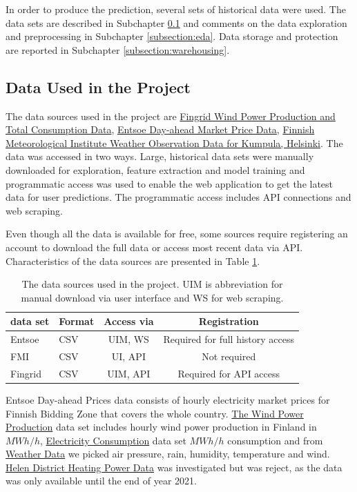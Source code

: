 \documentclass{article}
\begin{document}
In order to produce the prediction, several sets of historical data were used. The data sets are described in Subchapter \ref{subsection:datadescription} and comments on the data exploration and preprocessing in Subchapter \ref{subsection:eda}. Data storage and protection are reported in Subchapter \ref{subsection:warehousing}.

\subsection{Data Used in the Project}
\label{subsection:datadescription}


The data sources used in the project are \href{https://data.fingrid.fi/en}{Fingrid Wind Power Production and Total Consumption Data}, \href{https://transparency.entsoe.eu}{Entsoe Day-ahead Market Price Data}, \href{https://en.ilmatieteenlaitos.fi/open-data}{Finnish Meteorological Institute Weather Observation Data for Kumpula, Helsinki}. The data was accessed in two ways. Large, historical data sets were manually downloaded for exploration, feature extraction and model training and programmatic access was used to enable the web application to get the latest data for user predictions. The programmatic access includes API connections and web scraping.

Even though all the data is available for free, some sources require registering an account to download the full data or access most recent data via API. Characteristics of the data sources are presented in Table \ref{table:source-characteristics}.

\begin{table}[ht] 
\centering 
\begin{tabular}{l||l c c} 
data set & Format & Access via & Registration\\ 
\hline \hline
Entsoe & CSV & UIM, WS  & Required for full history access \\
FMI & CSV & UI, API & Not required \\
Fingrid & CSV & UIM, API & Required for API access \\
\hline
\end{tabular}
\caption{The data sources used in the project. UIM is abbreviation for manual download via user interface and WS for web scraping.}
\label{table:source-characteristics}
\end{table}

Entsoe Day-ahead Prices data consists of hourly electricity market prices for Finnish Bidding Zone that covers the whole country. \href{https://data.fingrid.fi/en/data set/wind-power-generation}{The Wind Power Production} data set includes hourly wind power production in Finland in $MWh/h$, \href{https://data.fingrid.fi/en/data set/electricity-consumption-in-finland}{Electricity Consumption} data set $MWh/h$ consumption and from \href{https://en.ilmatieteenlaitos.fi/open-data}{Weather Data} we picked air pressure, rain, humidity, temperature and wind. \href{https://www.helen.fi/en/company/responsibility/current-topics/open-data}{Helen District Heating Power Data} was investigated but was reject, as the data was only available until the end of year 2021.
\end{document}
